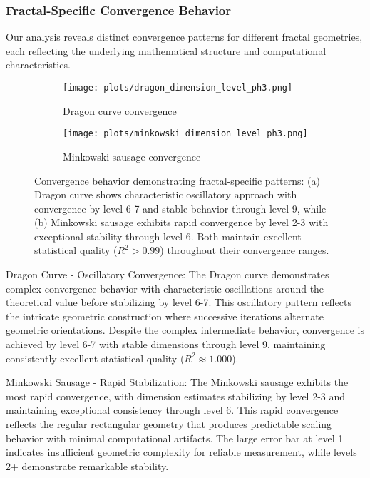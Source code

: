 \documentclass[preprint,12pt]{elsarticle}
\def\textbf#1{#1}%
\begin{document}
\subsubsection{Fractal-Specific Convergence Behavior}

Our analysis reveals distinct convergence patterns for different fractal geometries, each reflecting the underlying mathematical structure and computational characteristics.

\begin{figure}[H]
\centering
\begin{subfigure}[b]{0.48\textwidth}
    \centering
    \texttt{[image: plots/dragon\_dimension\_level\_ph3.png]}
    \caption{Dragon curve convergence}
    \label{fig:dragon_convergence}
\end{subfigure}
\hfill
\begin{subfigure}[b]{0.48\textwidth}
    \centering
    \texttt{[image: plots/minkowski\_dimension\_level\_ph3.png]}
    \caption{Minkowski sausage convergence}
    \label{fig:minkowski_convergence}
\end{subfigure}
\caption{Convergence behavior demonstrating fractal-specific patterns: (a) Dragon curve shows characteristic oscillatory approach with convergence by level 6-7 and stable behavior through level 9, while (b) Minkowski sausage exhibits rapid convergence by level 2-3 with exceptional stability through level 6. Both maintain excellent statistical quality ($R^2 > 0.99$) throughout their convergence ranges.}
\label{fig:convergence_examples}
\end{figure}

\textbf{Dragon Curve - Oscillatory Convergence}: The Dragon curve demonstrates complex convergence behavior with characteristic oscillations around the theoretical value before stabilizing by level 6-7. This oscillatory pattern reflects the intricate geometric construction where successive iterations alternate geometric orientations. Despite the complex intermediate behavior, convergence is achieved by level 6-7 with stable dimensions through level 9, maintaining consistently excellent statistical quality ($R^2 \approx 1.000$).

\textbf{Minkowski Sausage - Rapid Stabilization}: The Minkowski sausage exhibits the most rapid convergence, with dimension estimates stabilizing by level 2-3 and maintaining exceptional consistency through level 6. This rapid convergence reflects the regular rectangular geometry that produces predictable scaling behavior with minimal computational artifacts. The large error bar at level 1 indicates insufficient geometric complexity for reliable measurement, while levels 2+ demonstrate remarkable stability.
\end{document}
